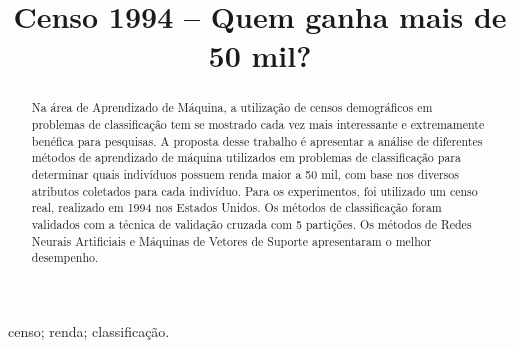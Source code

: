\documentclass[10pt, conference, compsocconf]{IEEEtran}
\begin{document}
%
\title{Censo 1994 – Quem ganha mais de 50 mil?}



\author{
}


\maketitle


\begin{abstract}
Na área de Aprendizado de Máquina, a utilização de censos demográficos em problemas de classificação tem se mostrado cada vez mais interessante e extremamente benéfica para pesquisas. A proposta desse trabalho é apresentar a análise de diferentes métodos de aprendizado de máquina utilizados em problemas de classificação para determinar quais indivíduos possuem renda maior a 50 mil, com base nos diversos atributos coletados para cada indivíduo. Para os experimentos, foi utilizado um censo real, realizado em 1994 nos Estados Unidos. Os métodos de classificação foram validados com a técnica de validação cruzada com 5 partições. Os métodos de Redes Neurais Artificiais e Máquinas de Vetores de Suporte apresentaram o melhor desempenho.

\end{abstract}

\begin{IEEEkeywords}
censo; renda; classificação.

\end{IEEEkeywords}


%
\IEEEpeerreviewmaketitle
\end{document}
